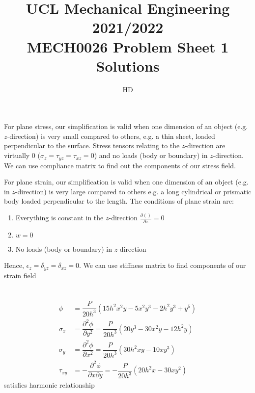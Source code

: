 \documentclass[11pt]{article}
\numberwithin{equation}{section}
\begin{document}
\title{\textbf{UCL Mechanical Engineering 2021/2022}\\MECH0026 Problem Sheet 1 Solutions}
\author{HD}
\maketitle
\section{}
\subsection{}
For plane stress, our simplification is valid when one dimension of an object (e.g. $z$-direction) is very small compared to others, e.g. a thin sheet, loaded perpendicular to the surface. Stress tensors relating to the $z$-direction are virtually 0 ($\sigma_z = \tau_{yz} = \tau_{xz} =0$) and no loads (body or boundary) in $z$-direction. We can use compliance matrix to find out the components of our stress field.

For plane strain, our simplification is valid when one dimension of an object (e.g. in $z$-direction) is very large compared to others e.g. a long cylindrical or prismatic body loaded perpendicular to the length. The conditions of plane strain are:
\begin{enumerate}
    \item Everything is constant in the $z$-direction $\frac{\partial ()}{\partial z} = 0$
    \item $w = 0$
    \item No loads (body or boundary) in $z$-direction
\end{enumerate}
Hence, $\epsilon_z = \delta_{yz} = \delta_{xz} =0$. We can use stiffness matrix to find components of our strain field
\section{}
\begin{align}
    \phi      & = \dfrac{P}{20h^3} \left(15h^2x^2y-5x^2y^3-2h^2y^3+y^5\right)                                    \\
    \sigma_x  & = \dfrac{\partial^2 \phi}{\partial y^2} = \dfrac{P}{20h^3}\left(20y^3 -30x^2y-12h^2y\right)      \\
    \sigma_y  & = \dfrac{\partial^2 \phi}{\partial x^2} = \dfrac{P}{20h^3}\left(30h^2xy-10xy^3\right)            \\
    \tau_{xy} & = -\dfrac{\partial^2 \phi}{\partial x\partial y} = - \dfrac{P}{20h^3} \left(20h^2x-30xy^2\right)
\end{align}
satisfies harmonic relationship
\end{document}
